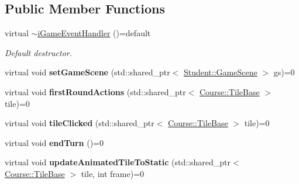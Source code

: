 \subsection*{Public Member Functions}
\begin{DoxyCompactItemize}
\item 
\hypertarget{class_course_1_1i_game_event_handler_a355e0d9635cc9b4888a1b77596431faa}{virtual \hyperlink{class_course_1_1i_game_event_handler_a355e0d9635cc9b4888a1b77596431faa}{$\sim$i\-Game\-Event\-Handler} ()=default}\label{class_course_1_1i_game_event_handler_a355e0d9635cc9b4888a1b77596431faa}

\begin{DoxyCompactList}\small\item\em Default destructor. \end{DoxyCompactList}\item 
\hypertarget{class_course_1_1i_game_event_handler_a085bdd5ee80ff0cd7dfeff9ddad66341}{virtual void {\bfseries set\-Game\-Scene} (std\-::shared\-\_\-ptr$<$ \hyperlink{class_student_1_1_game_scene}{Student\-::\-Game\-Scene} $>$ gs)=0}\label{class_course_1_1i_game_event_handler_a085bdd5ee80ff0cd7dfeff9ddad66341}

\item 
\hypertarget{class_course_1_1i_game_event_handler_aa85980d3caa036ca0421d9e06db39046}{virtual void {\bfseries first\-Round\-Actions} (std\-::shared\-\_\-ptr$<$ \hyperlink{class_course_1_1_tile_base}{Course\-::\-Tile\-Base} $>$ tile)=0}\label{class_course_1_1i_game_event_handler_aa85980d3caa036ca0421d9e06db39046}

\item 
\hypertarget{class_course_1_1i_game_event_handler_a90c7fc9b36084f2aaabc3a847e845cf2}{virtual void {\bfseries tile\-Clicked} (std\-::shared\-\_\-ptr$<$ \hyperlink{class_course_1_1_tile_base}{Course\-::\-Tile\-Base} $>$ tile)=0}\label{class_course_1_1i_game_event_handler_a90c7fc9b36084f2aaabc3a847e845cf2}

\item 
\hypertarget{class_course_1_1i_game_event_handler_aec68369399acf42c300f4d4f4b3e59f6}{virtual void {\bfseries end\-Turn} ()=0}\label{class_course_1_1i_game_event_handler_aec68369399acf42c300f4d4f4b3e59f6}

\item 
\hypertarget{class_course_1_1i_game_event_handler_a97cd035d2f7b296f11056919c9187094}{virtual void {\bfseries update\-Animated\-Tile\-To\-Static} (std\-::shared\-\_\-ptr$<$ \hyperlink{class_course_1_1_tile_base}{Course\-::\-Tile\-Base} $>$ tile, int frame)=0}\label{class_course_1_1i_game_event_handler_a97cd035d2f7b296f11056919c9187094}


\end{DoxyCompactItemize}
